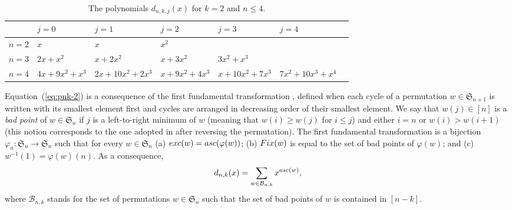 \documentclass[11pt]{amsart}
\newcommand{\asc}{{\rm asc}}
\newcommand{\exc}{{\rm exc}}
\newcommand{\Fix}{{\rm Fix}}
\newcommand{\bB}{{\mathcal B}}
\newcommand{\fS}{{\mathfrak S}}
\renewcommand{\to}{\rightarrow}
\begin{document}
{\scriptsize
\begin{table}[hptb]
\begin{center}
\begin{tabular}{| l || l | l | l | l | l | l ||} 
       \hline
& $j=0$ & $j=1$ & $j=2$ & $j=3$ & $j=4$ \\ \hline 
          \hline
$n=2$  & $x$ & $x$ & $x^2$ & & \\ \hline
$n=3$  & $2x+x^2$ & $x+2x^2$ & $x+3x^2$ & $3x^2+x^3$ 
       & \\ \hline
$n=4$  & $4x+9x^2+x^3$ & $2x+10x^2+2x^3$ & 
         $x+9x^2+4x^3$ & $x+10x^2+7x^3$ & 
				 $7x^2+10x^3+x^4$ \\ \hline
\end{tabular}

\bigskip
\caption{The polynomials $d_{n,k,j}(x)$ for $k=2$ 
         and $n \le 4$.}
\label{tab:dn2j}
\end{center}
\end{table}}

Equation~(\ref{eq:pnk-2}) is a consequence of  
the first fundamental transformation 
\cite[Section~I.3]{FSc70} 
\cite[Section~I.3]{StaEC1}, defined when each 
cycle of a permutation $w \in \fS_{n+1}$ is 
written with its smallest element first and 
cycles are arranged in decreasing order of 
their smallest element. We say that $w(j) \in 
[n]$ is a \emph{bad point} of $w \in \fS_n$ if 
$j$ is a left-to-right minimum of $w$ (meaning 
that $w(i) \ge w(j)$ for $i \le j$) and either 
$i = n$ or $w(i) > w(i+1)$ (this notion 
corresponds to the one adopted in 
\cite[Section~3]{Ath23+} after reversing the 
permutation). The first fundamental transformation 
is a bijection $\varphi_n : \fS_n \to \fS_n$ such 
that for every $w \in \fS_n$ (a) $\exc(w) = 
\asc(\varphi(w))$; (b) $\Fix(w)$ is equal to the 
set of bad points of $\varphi(w)$; and (c) $w^{-1}
(1) = \varphi(w)(n)$. As a consequence, 
%
\begin{equation} \label{eq:dnk-bad}
d_{n,k}(x) = \sum_{w \in \bB_{n,k}} x^{\asc(w)}, 
\end{equation}
%
where $\bB_{n,k}$ stands for the set of permutations 
$w \in \fS_n$ such that the set of bad points of $w$ 
is contained in $[n-k]$.
\end{document}
